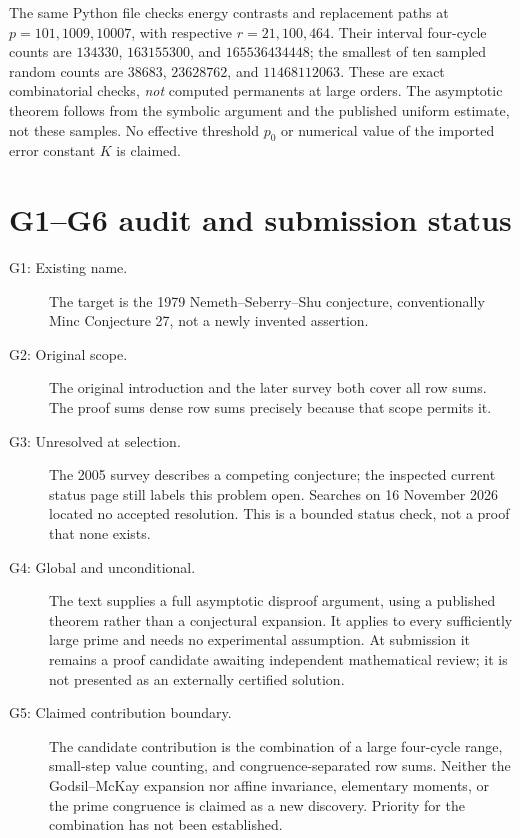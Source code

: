 \documentclass[11pt,a4paper]{article}
\begin{document}
The same Python file checks energy contrasts and replacement paths at $p=101,1009,10007$, with respective $r=21,100,464$. Their interval four-cycle counts are $134330$, $163155300$, and $165536434448$; the smallest of ten sampled random counts are $38683$, $23628762$, and $11468112063$. These are exact combinatorial checks, \emph{not} computed permanents at large orders. The asymptotic theorem follows from the symbolic argument and the published uniform estimate, not these samples. No effective threshold $p_0$ or numerical value of the imported error constant $K$ is claimed.

\section{G1--G6 audit and submission status}
\begin{description}
\item[G1: Existing name.] The target is the 1979 Nemeth--Seberry--Shu conjecture, conventionally Minc Conjecture 27, not a newly invented assertion.
\item[G2: Original scope.] The original introduction and the later survey both cover all row sums. The proof sums dense row sums precisely because that scope permits it.
\item[G3: Unresolved at selection.] The 2005 survey describes a competing conjecture; the inspected current status page still labels this problem open. Searches on 16 November 2026 located no accepted resolution. This is a bounded status check, not a proof that none exists.
\item[G4: Global and unconditional.] The text supplies a full asymptotic disproof argument, using a published theorem rather than a conjectural expansion. It applies to every sufficiently large prime and needs no experimental assumption. At submission it remains a proof candidate awaiting independent mathematical review; it is not presented as an externally certified solution.
\item[G5: Claimed contribution boundary.] The candidate contribution is the combination of a large four-cycle range, small-step value counting, and congruence-separated row sums. Neither the Godsil--McKay expansion nor affine invariance, elementary moments, or the prime congruence is claimed as a new discovery. Priority for the combination has not been established.

\end{description}
\end{document}
